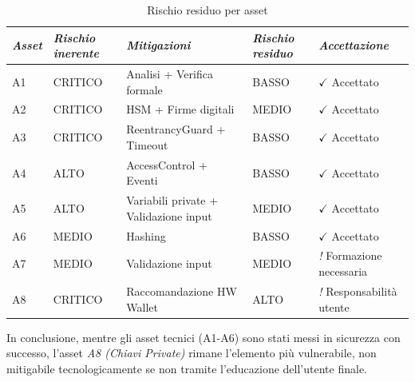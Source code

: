 \small
\begin{table}[H]
\centering
\caption{Rischio residuo per asset}
\label{tab:rischio-residuo}
\begin{tabularx}{\textwidth}{l l X l X}
\toprule
\textit{Asset} & \textit{Rischio inerente} & \textit{Mitigazioni} & \textit{Rischio residuo} & \textit{Accettazione} \\
\midrule
A1 & CRITICO & Analisi + Verifica formale & BASSO & $\checkmark$ Accettato \\
A2 & CRITICO & HSM + Firme digitali & MEDIO & $\checkmark$ Accettato \\
A3 & CRITICO & ReentrancyGuard + Timeout & BASSO & $\checkmark$ Accettato \\
A4 & ALTO & AccessControl + Eventi & BASSO & $\checkmark$ Accettato \\
A5 & ALTO & Variabili private + Validazione input & MEDIO & $\checkmark$ Accettato \\
A6 & MEDIO & Hashing & BASSO & $\checkmark$ Accettato \\
A7 & MEDIO & Validazione input & MEDIO & \textit{!} Formazione necessaria \\
A8 & CRITICO & Raccomandazione HW Wallet & ALTO & \textit{!} Responsabilità utente \\
\bottomrule
\end{tabularx}
\end{table}
\normalsize

In conclusione, mentre gli asset tecnici (A1-A6) sono stati messi in sicurezza con successo, l'asset \textit{A8 (Chiavi Private)} rimane l'elemento più vulnerabile, non mitigabile tecnologicamente se non tramite l'educazione dell'utente finale.